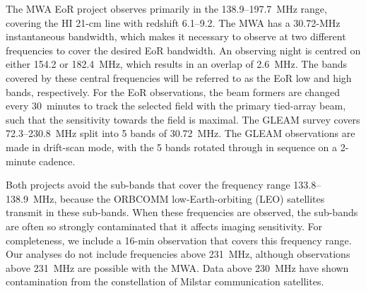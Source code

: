 \documentclass{pasa}
\begin{document}
The MWA EoR project observes primarily in the 138.9--197.7~MHz range, covering the HI 21-cm line with redshift 6.1--9.2. The MWA has a 30.72-MHz instantaneous bandwidth, which makes it necessary to observe at two different frequencies to cover the desired EoR bandwidth. An observing night is centred on either 154.2 or 182.4~MHz, which results in an overlap of 2.6~MHz. The bands covered by these central frequencies will be referred to as the EoR low and high bands, respectively. For the EoR observations, the beam formers are changed every 30~minutes to track the selected field with the primary tied-array beam, such that the sensitivity towards the field is maximal. The GLEAM survey covers 72.3--230.8~MHz split into 5 bands of 30.72~MHz. The GLEAM observations are made in drift-scan mode, with the 5 bands rotated through in sequence on a 2-minute cadence.

Both projects avoid the sub-bands that cover the frequency range 133.8--138.9~MHz, because the ORBCOMM low-Earth-orbiting (LEO) satellites transmit in these sub-bands. When these frequencies are observed, the sub-bands are often so strongly contaminated that it affects imaging sensitivity. For completeness, we include a 16-min observation that covers this frequency range. Our analyses do not include frequencies above 231~MHz, although observations above 231~MHz are possible with the MWA. Data above 230~MHz have shown contamination from the constellation of Milstar communication satellites.
\end{document}
